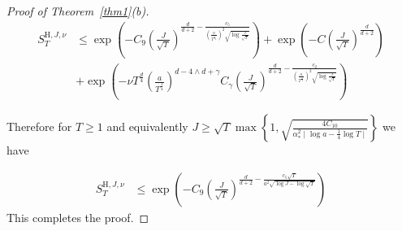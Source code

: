 \documentclass[12pt]{amsart}
\numberwithin{equation}{section}
\theoremstyle{definition}
\numberwithin{equation}{section}
\newcommand{\HH}{\text{H}}
\begin{document}
\begin{proof}[Proof of Theorem~\ref{thm1}(\textup{b})]
\begin{align*}
  S_T^{\HH, J, \nu}& \le \exp\left(-C_9 {\left(\frac{J}{\sqrt{T}} \right)}^{\frac{d}{d+2} -\frac{c_5}{\left( {\frac{a}{T^{\frac14}}} \right)^2 \sqrt{\log {\frac{J}{\sqrt{T}}}} }}\right) + \exp\left(-C {\left(\frac{J}{\sqrt{T}} \right)}^{\frac{d}{d+2}}\right) \nonumber \\
  & + \exp\left(-{\nu T^{\frac{d}{4}}} \left({\frac{a}{T^{\frac14}}}\right)^{d-4\wedge d +\gamma} C_\gamma \left( \frac{J}{\sqrt{T}} \right)^{\frac{d}{d+2} -\frac{c_2}{\left (\frac{a}{T^{\frac14}} \right)^2 \sqrt{\log \frac{J}{\sqrt{T}}}} } \right) 
\end{align*}

Therefore for  $T \geq 1$ and equivalently $J \geq  \sqrt{T} \max \left\{1, \sqrt{\frac{4C_{10}}{ \alpha_*^2\mid \log a - \frac{1}{4}\log T\mid  }} \right \}$ we have

\begin{align*}
  S_T^{\HH, J, \nu}& \le \exp\left(-C_9 \left(\frac{J}{\sqrt{T}} \right)^{\frac{d}{d+2} -\frac{c_5\sqrt{ T} }{a^2 \sqrt{\log J - \log \sqrt{T}}}}\right)
\end{align*}
This completes the proof.
\end{proof}

%
% 
  
\end{document}
